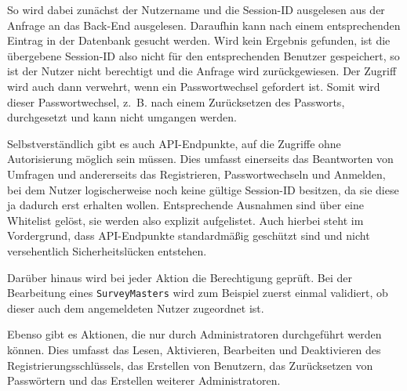 So wird dabei zunächst der Nutzername und die Session-ID ausgelesen aus der Anfrage an das Back-End ausgelesen.
Daraufhin kann nach einem entsprechenden Eintrag in der Datenbank gesucht werden.
Wird kein Ergebnis gefunden, ist die übergebene Session-ID also nicht für den entsprechenden Benutzer gespeichert, so ist der Nutzer nicht berechtigt und die Anfrage wird zurückgewiesen.
Der Zugriff wird auch dann verwehrt, wenn ein Passwortwechsel gefordert ist.
Somit wird dieser Passwortwechsel, z.~B. nach einem Zurücksetzen des Passworts, durchgesetzt und kann nicht umgangen werden.

Selbstverständlich gibt es auch \acs{API}-Endpunkte, auf die Zugriffe ohne Autorisierung möglich sein müssen.
Dies umfasst einerseits das Beantworten von Umfragen und andererseits das Registrieren, Passwortwechseln und Anmelden, bei dem Nutzer logischerweise noch keine gültige Session-ID besitzen, da sie diese ja dadurch erst erhalten wollen.
Entsprechende Ausnahmen sind über eine Whitelist gelöst, sie werden also explizit aufgelistet.
Auch hierbei steht im Vordergrund, dass \acs{API}-Endpunkte standardmäßig geschützt sind und nicht versehentlich Sicherheitslücken entstehen.

Darüber hinaus wird bei jeder Aktion die Berechtigung geprüft.
Bei der Bearbeitung eines \texttt{SurveyMasters} wird zum Beispiel zuerst einmal validiert, ob dieser auch dem angemeldeten Nutzer zugeordnet ist.

Ebenso gibt es Aktionen, die nur durch Administratoren durchgeführt werden können.
Dies umfasst das Lesen, Aktivieren, Bearbeiten und Deaktivieren des Registrierungsschlüssels, das Erstellen von Benutzern, das Zurücksetzen von Passwörtern und das Erstellen weiterer Administratoren.
